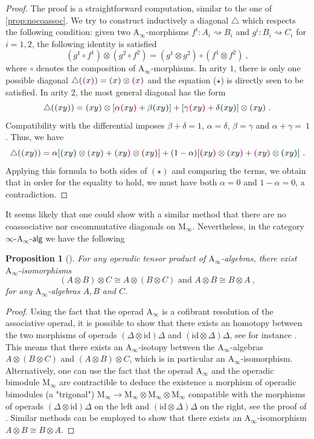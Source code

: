 \documentclass[twoside, 12pt]{amsart}
\newtheorem{proposition}[definition]{Proposition}
\theoremstyle{remark}
\newcommand{\Ainf}{\mathrm{A}_\infty} %
\newcommand{\Minf}{\mathrm{M}_\infty} %
\newcommand{\infAalg}{\ensuremath{\infty\text{-}\mathrm{A}_\infty\text{-}\mathsf{alg}}} %
\newcommand{\ide}{\ensuremath{\mathrm{id}}}
\newcommand{\blue}[1]{\textcolor{MidnightBlue}{\textbf{(}} #1 \textcolor{MidnightBlue}{\textbf{)}}}
\newcommand{\red}[1]{\textcolor{BrickRed}{\textbf{(}} #1 \textcolor{BrickRed}{\textbf{)}}}
\newcommand{\purple}[1]{\textcolor{Purple}{\textbf{(}} #1 \textcolor{Purple}{\textbf{)}}}
\begin{document}
\begin{enumerate}[leftmargin=*, itemsep=0.5em]
\begin{proof} 
  The proof is a straightforward computation, similar to the one of \cref{prop:nocoassoc}. 
  We try to construct inductively a diagonal $\triangle$ which respects the following condition: given two $\Ainf$-morphisms $f^i : A_i \rightsquigarrow B_i$ and $g^i : B_i \rightsquigarrow C_i$ for $i=1,2$, the following identity is satisfied \[ (g^1 \circ f^1) \otimes (g^2 \circ f^2) = (g^1 \otimes g^2) \circ (f^1 \otimes f^2) \ , \tag{$\star$}\]
  where $\circ$ denotes the composition of $\Ainf$-morphisms. 
  In arity $1$, there is only one possible diagonal $\triangle(\purple{x})=\purple{x} \otimes \purple{x}$ and the equation ($\star$) is directly seen to be satisfied. 
  In arity $2$, the most general diagonal has the form \[ \triangle(\purple{xy})=\purple{xy} \otimes [\alpha \red{xy} + \beta \blue{xy}] + [\gamma \red{xy}+ \delta \blue{xy}]\otimes \purple{xy} \ . \]
  Compatibility with the differential imposes $\beta + \delta =1$, $\alpha=\delta$, $\beta=\gamma$ and $\alpha + \gamma =~1$.
  Thus, we have \[\triangle (\purple{xy})= \alpha [\blue{xy}\otimes \purple{xy} + \purple{xy}\otimes\red{xy}] + (1-\alpha)[\red{xy}\otimes \purple{xy}+\purple{xy}\otimes \blue{xy}] \ . \] 
  Applying this formula to both sides of $(\star)$ and comparing the terms, we obtain that in order for the equality to hold, we must have both $\alpha=0$ and $1-\alpha=0$, a contradiction. 
\end{proof}
It seems likely that one could show with a similar method that there are no coassociative nor cocommutative diagonals on $\Minf$.
Nevertheless, in the category $\infAalg$ we have the following
\begin{proposition}[{\cite{MSS,LOT20}}]
  For any operadic tensor product of $\Ainf$-algebras, there exist $\Ainf$-isomorphisms
  \[ (A \otimes B) \otimes C \cong A \otimes (B \otimes C) \text{  and  } A \otimes B \cong B \otimes A \ , \] for any $\Ainf$-algebras $A,B$ and $C$. 
\end{proposition}

\begin{proof}
Using the fact that the operad $\Ainf$ is a cofibrant resolution of the associative operad, it is possible to show that there exists an homotopy between the two morphisms of operads $(\Delta \otimes \ide) \Delta$ and $(\ide \otimes \Delta ) \Delta$, see for instance \cite[Proposition 3.136]{MSS}. 
This means that there exists an $\Ainf$-isotopy between the $\Ainf$-algebras $A \otimes ( B \otimes C)$ and $(A \otimes B) \otimes C$, which is in particular an $\Ainf$-isomorphism.    
Alternatively, one can use the fact that the operad $\Ainf$ and the operadic bimodule $\Minf$ are contractible to deduce the existence a morphism of operadic bimodules (a "trigonal") $\Minf \rightarrow \Minf \otimes \Minf \otimes \Minf$ compatible with the morphisms of operads $(\Delta \otimes \ide) \Delta$ on the left and $(\ide \otimes \Delta ) \Delta$ on the right, see the proof of \cite[Theorem 1.1]{LOT20}. 
Similar methods can be employed to show that there exists an $\Ainf$-isomorphism $A \otimes B \cong B \otimes A$.
\end{proof}


\end{enumerate}
\end{document}
